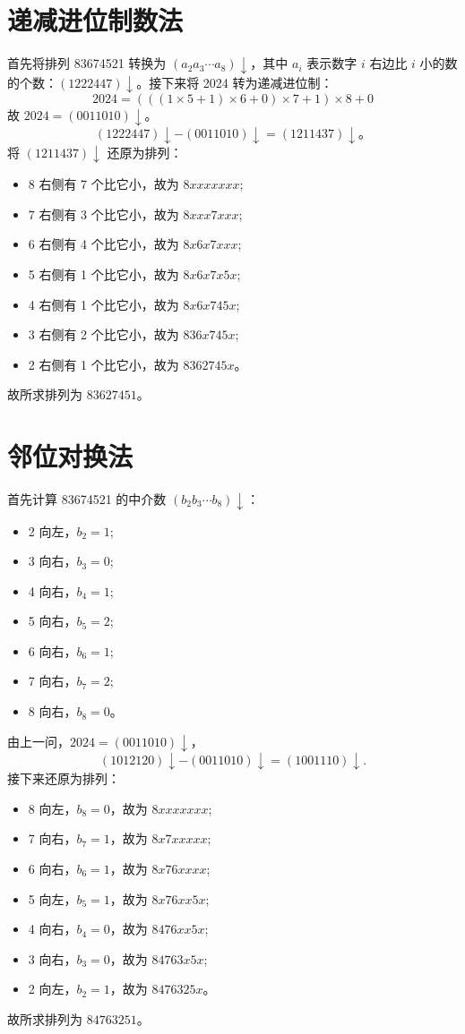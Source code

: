 \documentclass{article}
\begin{document}
\section{递减进位制数法}
首先将排列 83674521 转换为 $(a_2a_3\cdots a_8)\downarrow$，其中 $a_i$ 表示数字 $i$ 右边比 $i$ 小的数的个数：$(1222447)\downarrow$。接下来将 2024 转为递减进位制：
\begin{equation}
    2024 = (((1\times 5 + 1)\times 6 + 0)\times 7 + 1) \times 8 + 0
\end{equation}
故 $2024=(0011010)\downarrow$。
\begin{equation}
    (1222447)\downarrow-(0011010)\downarrow=(1211437)\downarrow。
\end{equation}
将 $(1211437)\downarrow$ 还原为排列：
\begin{itemize}
    \item 8 右侧有 7 个比它小，故为 $8xxxxxxx$;
    \item 7 右侧有 3 个比它小，故为 $8xxx7xxx$;
    \item 6 右侧有 4 个比它小，故为 $8x6x7xxx$;
    \item 5 右侧有 1 个比它小，故为 $8x6x7x5x$;
    \item 4 右侧有 1 个比它小，故为 $8x6x745x$;
    \item 3 右侧有 2 个比它小，故为 $836x745x$;
    \item 2 右侧有 1 个比它小，故为 $8362745x$。
\end{itemize}
故所求排列为 $83627451$。

\section{邻位对换法}
首先计算 83674521 的中介数 $(b_2b_3\cdots b_8)\downarrow$：
\begin{itemize}
    \item 2 向左，$b_2=1$;
    \item 3 向右，$b_3=0$;
    \item 4 向右，$b_4=1$;
    \item 5 向右，$b_5=2$;
    \item 6 向右，$b_6=1$;
    \item 7 向右，$b_7=2$;
    \item 8 向右，$b_8=0$。
\end{itemize}
由上一问，$2024=(0011010)\downarrow$，
\begin{equation}
    (1012120)\downarrow-(0011010)\downarrow=(1001110)\downarrow.
\end{equation}
接下来还原为排列：
\begin{itemize}
    \item 8 向左，$b_8=0$，故为 $8xxxxxxx$;
    \item 7 向右，$b_7=1$，故为 $8x7xxxxx$;
    \item 6 向右，$b_6=1$，故为 $8x76xxxx$;
    \item 5 向左，$b_5=1$，故为 $8x76xx5x$;
    \item 4 向右，$b_4=0$，故为 $8476xx5x$;
    \item 3 向右，$b_3=0$，故为 $84763x5x$;
    \item 2 向左，$b_2=1$，故为 $8476325x$。
\end{itemize}
故所求排列为 $84763251$。
\end{document}
